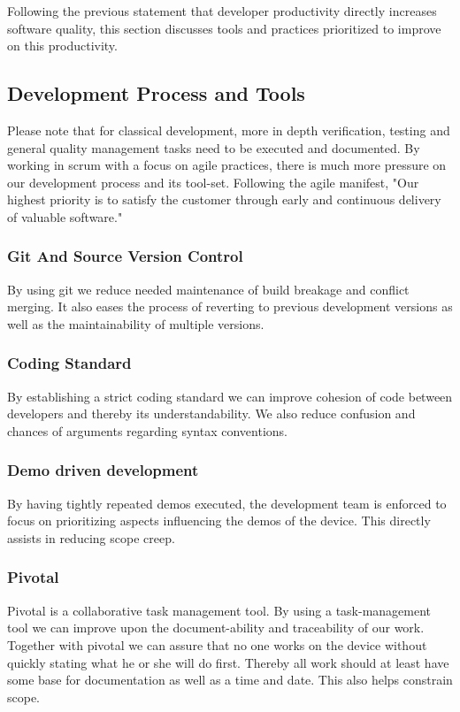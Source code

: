 \documentclass{article}
\begin{document}
Following the previous statement that developer productivity directly increases software quality, this section discusses tools and practices prioritized to improve on this productivity.

\subsection{Development Process and Tools}
Please note that for classical development, more in depth verification, testing and general quality management tasks need to be executed and documented.
By working in scrum with a focus on agile practices, there is much more pressure on our development process and its tool-set.
Following the agile manifest, "Our highest priority is to satisfy the customer through early and continuous delivery of valuable software."

\subsubsection{Git And Source Version Control}
By using git we reduce needed maintenance of build breakage and conflict merging.
It also eases the process of reverting to previous development versions as well as the maintainability of multiple versions.

\subsubsection{Coding Standard}
By establishing a strict coding standard we can improve cohesion of code between developers and thereby its understandability.
We also reduce confusion and chances of arguments regarding syntax conventions.

\subsubsection{Demo driven development}

By having tightly repeated demos executed, the development team is enforced to focus on prioritizing aspects influencing the demos of the device.
This directly assists in reducing scope creep.

\subsubsection{Pivotal}

Pivotal is a collaborative task management tool.
By using a task-management tool we can improve upon the document-ability and traceability of our work.
Together with pivotal we can assure that no one works on the device without quickly stating what he or she will do first.
Thereby all work should at least have some base for documentation as well as a time and date.
This also helps constrain scope.
\end{document}
